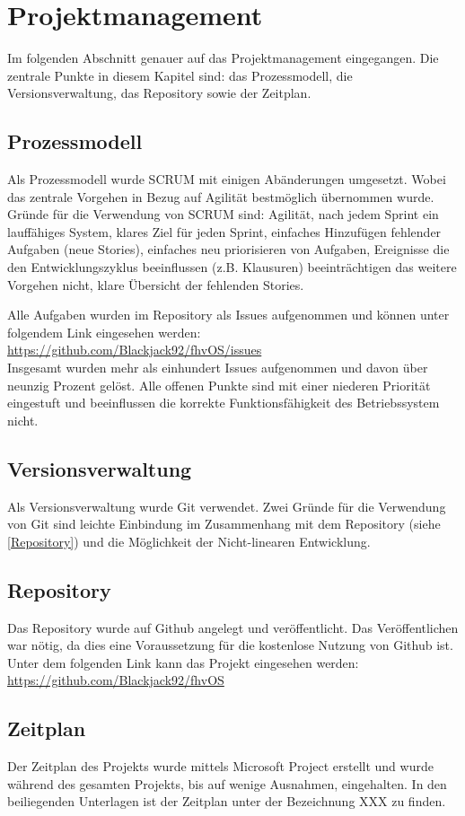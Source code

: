 \section{Projektmanagement}
Im folgenden Abschnitt genauer auf das Projektmanagement eingegangen. Die zentrale Punkte in diesem Kapitel sind: das Prozessmodell, die Versionsverwaltung, das Repository sowie der Zeitplan.

\subsection{Prozessmodell}
Als Prozessmodell wurde SCRUM mit einigen Abänderungen umgesetzt. Wobei das zentrale Vorgehen in Bezug auf Agilität bestmöglich übernommen wurde. Gründe für die Verwendung von SCRUM sind: Agilität, nach jedem Sprint ein lauffähiges System, klares Ziel für jeden Sprint, einfaches Hinzufügen fehlender Aufgaben (neue Stories), einfaches neu priorisieren von Aufgaben, Ereignisse die den Entwicklungszyklus beeinflussen (z.B. Klausuren) beeinträchtigen das weitere Vorgehen nicht, klare Übersicht der fehlenden Stories.

Alle Aufgaben wurden im Repository als Issues aufgenommen und können unter folgendem Link eingesehen werden: \\

\url{https://github.com/Blackjack92/fhvOS/issues} \\

Insgesamt wurden mehr als einhundert Issues aufgenommen und davon über neunzig Prozent gelöst. Alle offenen Punkte sind mit einer niederen Priorität eingestuft und beeinflussen die korrekte Funktionsfähigkeit des Betriebssystem nicht.

\subsection{Versionsverwaltung}
Als Versionsverwaltung wurde Git verwendet. Zwei Gründe für die Verwendung von Git sind leichte Einbindung im Zusammenhang mit dem Repository (siehe \ref{Repository}) und die Möglichkeit der Nicht-linearen Entwicklung.

\subsection{Repository}
Das Repository wurde auf Github angelegt und veröffentlicht. Das Veröffentlichen war nötig, da dies eine Voraussetzung für die kostenlose Nutzung von Github ist. Unter dem folgenden Link kann das Projekt eingesehen werden: \\

\url{https://github.com/Blackjack92/fhvOS} \\

\subsection{Zeitplan}
Der Zeitplan des Projekts wurde mittels Microsoft Project erstellt und wurde während des gesamten Projekts, bis auf wenige Ausnahmen, eingehalten. In den beiliegenden Unterlagen ist der Zeitplan unter der Bezeichnung XXX zu finden.

\pagebreak 